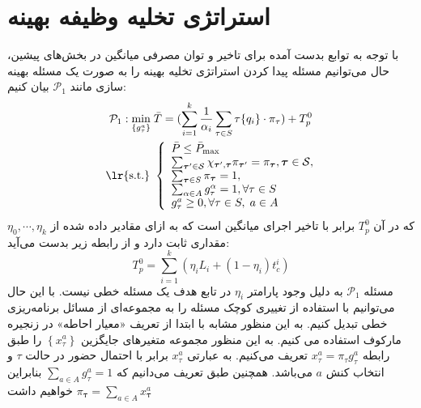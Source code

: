 \section{استراتژی تخلیه وظیفه بهینه}
\label{sec:strat}
با توجه به توابع بدست آمده برای تاخیر و توان مصرفی میانگین در بخش‌های پیشین، حال می‌توانیم مسئله پیدا کردن استراتژی تخلیه بهینه را به صورت یک مسئله بهینه سازی مانند
$\mathcal{P}_{1}$
بیان کنیم:
\begin{equation}
		\begin{aligned}
			\mathcal{P}_{1}: \min _{\left\{g_{\tau}^{a}\right\}}\; & \bar{T} = (\sum_{i=1}^{k} \frac{1}{\alpha_i} \sum_{\tau \in S} \tau\{q_i\} \cdot \pi_{\tau}) + T_p^0 \\
			\text { \lr{s.t.} } &\left\{\begin{array}{l}
				\bar{P} \leq \bar{P}_{\max } \\
				\sum_{\boldsymbol{\tau}^{\prime} \in \mathcal{S}} \chi_{\boldsymbol{\tau}^{\prime}, \boldsymbol{\tau}} \pi_{\boldsymbol{\tau}^{\prime}}=\pi_{\boldsymbol{\tau}}, \boldsymbol{\tau} \in \mathcal{S}, \\
				\sum_{\boldsymbol{\tau} \in S} \pi_{\boldsymbol{\tau}}=1, \\
				\sum_{\alpha \in A} g_{\tau}^{\alpha}=1, \forall \tau \in S\\
				g_{\tau}^{a} \geq 0, \forall \tau \in S,\;a \in A
			\end{array}\right.
		\end{aligned}
\end{equation}
که در آن
$T_p^0$
برابر با تاخیر اجرای میانگین است که به ازای مقادیر داده شده از
$\eta_0, \cdots, \eta_k$
مقداری ثابت دارد و از رابطه زیر بدست می‌آید:
\begin{equation}
	T_p^0 = \sum_{i=1}^{k} (\eta_i L_i+(1-\eta_i) t_{c}^i)
\end{equation}
مسئله
$\mathcal{P}_{1}$
به دلیل وجود پارامتر $\eta_i$ در تابع هدف یک مسئله خطی نیست. با این حال می‌توانیم با استفاده از تغییری کوچک مسئله را به مجموعه‌ای از مسائل برنامه‌ریزی خطی تبدیل کنیم. به این منظور مشابه با \cite{Liu} ابتدا از تعریف «معیار احاطه» در زنجیره مارکوف استفاده می کنیم. به این منظور مجموعه متغیرهای جایگزین $\left\{x_{\tau}^{a}\right\}$ را طبق رابطه $x_{\tau}^{a}=\pi_{\tau} g_{\tau}^{a}$ تعریف می‌کنیم. به عبارتی $x_{\tau}^{a}$ برابر با احتمال حضور در حالت $\tau$ و انتخاب کنش
$a$
می‌باشد. همچنین طبق تعریف می‌دانیم که
$\sum_{a \in A} g_{\tau}^{a}=1$
بنابراین خواهیم داشت
$\pi_{\boldsymbol{\tau}}=\sum_{a \in A} x_{\boldsymbol{\tau}}^{a}$
\\\\
